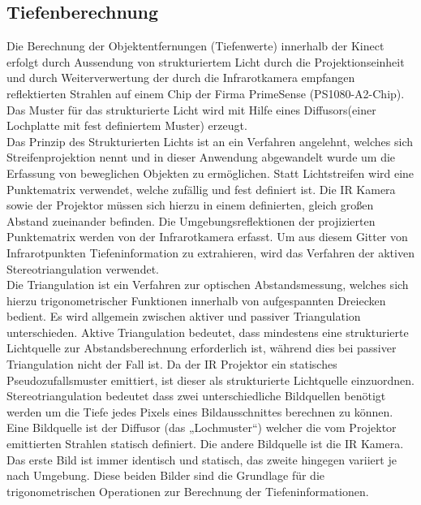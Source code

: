 \subsection{Tiefenberechnung}
Die Berechnung der Objektentfernungen (Tiefenwerte) innerhalb der Kinect erfolgt durch Aussendung von strukturiertem Licht durch die Projektionseinheit und durch Weiterverwertung  der durch die Infrarotkamera empfangen reflektierten Strahlen auf einem Chip der Firma PrimeSense (PS1080-A2-Chip). Das Muster für das strukturierte Licht wird mit Hilfe eines Diffusors(einer Lochplatte mit fest definiertem Muster) erzeugt.\\
Das Prinzip des Strukturierten Lichts ist an ein Verfahren angelehnt, welches sich Streifenprojektion nennt und in dieser Anwendung abgewandelt wurde um die Erfassung von beweglichen Objekten zu ermöglichen. Statt Lichtstreifen wird eine Punktematrix verwendet, welche zufällig und fest definiert ist. Die IR Kamera sowie der Projektor müssen sich hierzu in einem definierten, gleich großen Abstand zueinander befinden.
Die Umgebungsreflektionen der projizierten Punktematrix werden von der Infrarotkamera erfasst.
Um aus diesem Gitter von Infrarotpunkten Tiefeninformation zu extrahieren, wird das Verfahren der aktiven Stereotriangulation verwendet.\\
Die Triangulation ist ein Verfahren zur optischen Abstandsmessung, welches sich hierzu trigonometrischer Funktionen innerhalb von aufgespannten Dreiecken bedient. 
Es wird allgemein zwischen aktiver und passiver Triangulation unterschieden.
Aktive Triangulation bedeutet, dass mindestens eine strukturierte Lichtquelle zur Abstandsberechnung erforderlich ist, während dies bei passiver Triangulation nicht der Fall ist.
Da der IR Projektor ein statisches Pseudozufallsmuster emittiert, ist dieser als strukturierte Lichtquelle einzuordnen.
Stereotriangulation bedeutet dass zwei unterschiedliche Bildquellen benötigt werden um die Tiefe jedes Pixels eines Bildausschnittes berechnen zu können.
Eine Bildquelle ist der Diffusor (das „Lochmuster“) welcher die vom Projektor emittierten Strahlen statisch definiert. Die andere Bildquelle ist die IR Kamera.
Das erste Bild ist immer identisch und statisch, das zweite hingegen variiert je nach Umgebung. Diese beiden Bilder sind die Grundlage für die trigonometrischen Operationen zur Berechnung der Tiefeninformationen.

